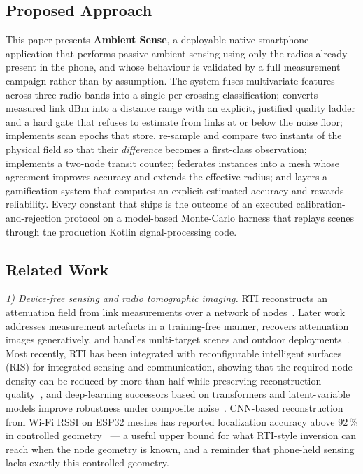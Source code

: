 \documentclass[journal,10pt]{IEEEtran}
\begin{document}
\subsection{Proposed Approach}
This paper presents \textbf{Ambient Sense}, a deployable native smartphone
application that performs passive ambient sensing using only the radios already
present in the phone, and whose behaviour is validated by a full measurement
campaign rather than by assumption. The system fuses multivariate features
across three radio bands into a single per-crossing classification; converts
measured link dBm into a distance range with an explicit, justified quality
ladder and a hard gate that refuses to estimate from links at or below the
noise floor; implements scan epochs that store, re-sample and compare two
instants of the physical field so that their \emph{difference} becomes a
first-class observation; implements a two-node transit counter; federates
instances into a mesh whose agreement improves accuracy and extends the
effective radius; and layers a gamification system that computes an explicit
estimated accuracy and rewards reliability. Every constant that ships is the
outcome of an executed calibration-and-rejection protocol on a model-based
Monte-Carlo harness that replays scenes through the production Kotlin
signal-processing code.

\subsection{Related Work}
\textit{1) Device-free sensing and radio tomographic imaging.} RTI reconstructs
an attenuation field from link measurements over a network of
nodes~\cite{wilson2010}. Later work addresses measurement artefacts in a
training-free manner, recovers attenuation images generatively, and handles
multi-target scenes and outdoor deployments~\cite{alippi2016,wu2024}. Most
recently, RTI has been integrated with reconfigurable intelligent surfaces (RIS)
for integrated sensing and communication, showing that the required node
density can be reduced by more than half while preserving reconstruction
quality~\cite{li2024}, and deep-learning successors based on transformers and
latent-variable models improve robustness under composite noise~\cite{wu2024}.
CNN-based reconstruction from Wi-Fi RSSI on ESP32 meshes has reported
localization accuracy above 92\,\% in controlled geometry~\cite{cnnrti2025} ---
a useful upper bound for what RTI-style inversion can reach when the node
geometry is known, and a reminder that phone-held sensing lacks exactly this
controlled geometry.
\end{document}
